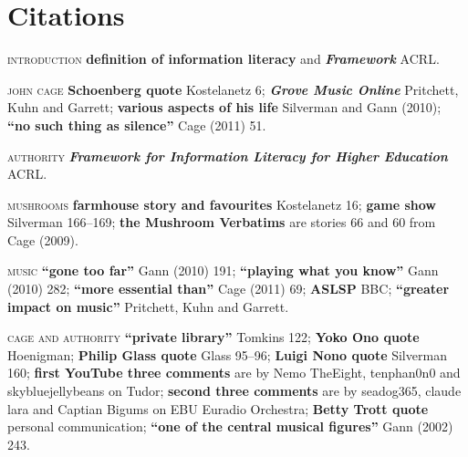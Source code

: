 




\newpageforperformers{}

\section{Citations}

\textsc{introduction}
\textbf{definition of information literacy} and
\textbf{\textit{Framework}} ACRL.

\textsc{john cage}
\textbf{Schoenberg quote} Kostelanetz 6;
\textbf{\textit{Grove Music Online}} Pritchett, Kuhn and Garrett;
\textbf{various aspects of his life} Silverman and Gann (2010);
\textbf{``no such thing as silence''} Cage (2011) 51.

\textsc{authority}
\textbf{\textit{Framework for Information Literacy for Higher Education}} ACRL.

\textsc{mushrooms}
\textbf{farmhouse story and favourites} Kostelanetz 16;
\textbf{game show} Silverman 166--169;
\textbf{the Mushroom Verbatims} are stories 66 and 60 from Cage (2009).

\textsc{music}
\textbf{``gone too far''} Gann (2010) 191;
\textbf{``playing what you know''} Gann (2010) 282;
\textbf{``more essential than''} Cage (2011) 69;
\textbf{ASLSP} BBC;
\textbf{``greater impact on music''} Pritchett, Kuhn and Garrett.

\textsc{cage and authority}
\textbf{``private library''} Tomkins 122;
\textbf{Yoko Ono quote} Hoenigman;
\textbf{Philip Glass quote} Glass 95--96;
\textbf{Luigi Nono quote} Silverman 160;
\textbf{first YouTube three comments} are by Nemo TheEight, tenphan0n0 and skybluejellybeans on Tudor;
\textbf{second three comments} are by seadog365, claude lara and Captian Bigums on EBU Euradio Orchestra;
\textbf{Betty Trott quote} personal communication;
\textbf{``one of the central musical figures''} Gann (2002) 243.

